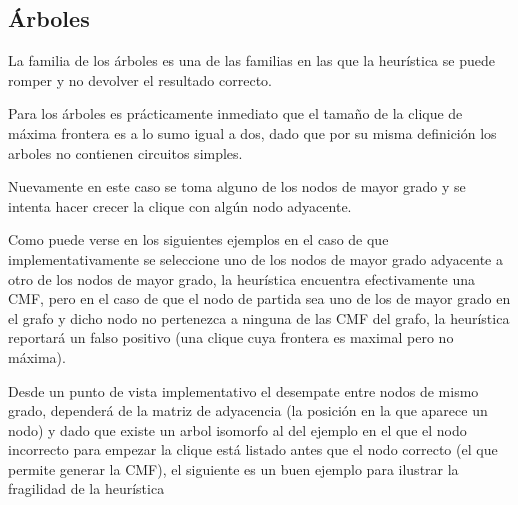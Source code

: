 \subsection{\'Arboles}
La familia de los \'arboles es una de las familias en las que la heur\'istica
se puede romper y no devolver el resultado correcto. 

Para los \'arboles es pr\'acticamente inmediato que el 
tama\~no de la clique de m\'axima frontera es a lo sumo igual a dos, dado
que por su misma definici\'on los arboles no contienen circuitos simples.

Nuevamente en este caso se toma alguno de los nodos de mayor grado 
y se intenta hacer crecer la clique con alg\'un nodo adyacente.

Como puede verse en los siguientes ejemplos en el caso de que 
implementativamente se seleccione uno de los nodos de mayor grado
adyacente a otro de los nodos de mayor grado, la heur\'istica encuentra
efectivamente una CMF, pero en el caso de que el nodo de partida sea 
uno de los de mayor grado en el grafo y dicho nodo no pertenezca a
ninguna de las CMF del grafo, la heur\'istica reportar\'a un falso 
positivo (una clique cuya frontera es maximal pero no m\'axima).

Desde un punto de vista implementativo el desempate entre nodos de 
mismo grado, depender\'a de la matriz de adyacencia (la posici\'on en
la que aparece un nodo) y dado que existe un arbol isomorfo al del 
ejemplo en el que el nodo incorrecto para empezar la clique est\'a
listado antes que el nodo correcto (el que permite generar la CMF),
el siguiente es un buen ejemplo para ilustrar la fragilidad de la
heur\'istica


